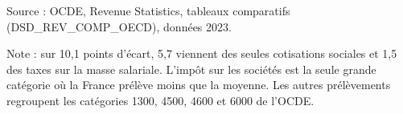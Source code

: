 Source : OCDE, Revenue Statistics, tableaux comparatifs (DSD\_REV\_COMP\_OECD), données 2023.\par Note : sur 10,1 points d'écart, 5,7 viennent des seules cotisations sociales et 1,5 des taxes sur la masse salariale. L'impôt sur les sociétés est la seule grande catégorie où la France prélève moins que la moyenne. Les autres prélèvements regroupent les catégories 1300, 4500, 4600 et 6000 de l'OCDE.
